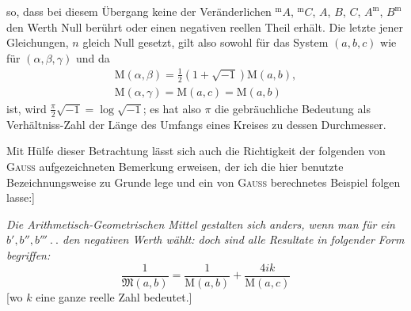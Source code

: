 so, dass bei diesem Übergang keine der Veränderlichen ${}^{\mathrm{m}}A$, ${}^{\mathrm{m}}C$, $A$, $B$, $C$, $A^{\mathrm{m}}$, $B^{\mathrm{m}}$ den Werth Null berührt oder einen negativen reellen Theil erhält. Die letzte jener Gleichungen, $n$ gleich Null gesetzt, gilt also sowohl für das System $(a,b,c)$ wie für $(\alpha,\beta,\gamma)$ und da
\[
\begin{gathered}\mathrm{M}(\alpha,\beta)=\tfrac12(1+\surd{-1})\mathrm{M}(a,b),\\[7pt]
\mathrm{M}(\alpha,\gamma)=\mathrm{M}(a,c)=\mathrm{M}(a,b)\end{gathered}
\]
ist, wird $\frac{\pi}{2}\surd{-1}=\log\surd{-1}$; es hat also $\pi$ die gebräuchliche Bedeutung als Verhältniss-Zahl der Länge des Umfangs eines Kreises zu dessen Durchmesser.

\par Mit Hülfe dieser Betrachtung lässt sich auch die Richtigkeit der folgenden von \textsc{Gauss} aufgezeichneten Bemerkung erweisen, der ich die hier benutzte Bezeichnungsweise zu Grunde lege und ein von \textsc{Gauss} berechnetes Beispiel folgen lasse:]
\par \textit{Die Arithmetisch-Geometrischen Mittel gestalten sich anders, wenn man für ein $b', b'', b'''\ .\ .$ den negativen Werth wählt: doch sind alle Resultate in folgender Form begriffen:}
\[
\frac{1}{\mathfrak{M}(a,b)}=\frac{1}{\mathrm{M}(a,b)}+\frac{4ik}{\mathrm{M}(a,c)}
\]
[wo $k$ eine ganze reelle Zahl bedeutet.]

